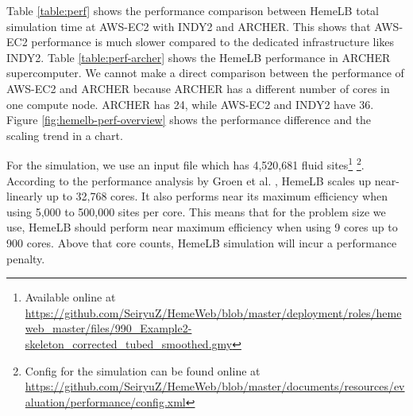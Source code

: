 \noindent%
\begin{minipage}{\linewidth}%
 \label{fig:hemelb-perf-overview}%
\end{minipage}

\vspace{0.5cm}


Table \ref{table:perf} shows the performance comparison between HemeLB total simulation time at AWS-EC2 with INDY2 and ARCHER. This shows that AWS-EC2 performance is much slower compared to the dedicated infrastructure likes INDY2. Table \ref{table:perf-archer} shows the HemeLB performance in ARCHER supercomputer. We cannot make a direct comparison between the performance of AWS-EC2 and ARCHER because ARCHER has a different number of cores in one compute node. ARCHER has 24, while AWS-EC2 and INDY2 have 36. Figure \ref{fig:hemelb-perf-overview} shows the performance difference and the scaling trend in a chart. 


For the simulation, we use an input file which has 4,520,681 fluid sites\footnote{Available online at \url{https://github.com/SeiryuZ/HemeWeb/blob/master/deployment/roles/hemeweb_master/files/990_Example2-skeleton_corrected_tubed_smoothed.gmy}}  \footnote{Config for the simulation can be found online at \url{https://github.com/SeiryuZ/HemeWeb/blob/master/documents/resources/evaluation/performance/config.xml}}. According to the performance analysis by Groen et al. \citep{groen2013analysing}, HemeLB scales up near-linearly up to 32,768 cores. It also performs near its maximum efficiency when using 5,000 to 500,000 sites per core. This means that for the problem size we use, HemeLB should perform near maximum efficiency when using 9 cores up to 900 cores. Above that core counts, HemeLB simulation will incur a performance penalty.




